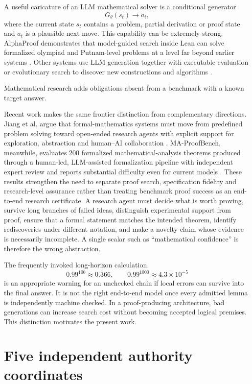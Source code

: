 \documentclass[11pt]{article}
\begin{document}
A useful caricature of an LLM mathematical solver is a conditional generator
\[
G_\theta(s_t)\rightarrow a_t,
\]
where the current state $s_t$ contains a problem, partial derivation or proof state and $a_t$ is a plausible next move. This capability can be extremely strong. AlphaProof demonstrates that model-guided search inside Lean can solve formalized olympiad and Putnam-level problems at a level far beyond earlier systems \cite{hubert2025}. Other systems use LLM generation together with executable evaluation or evolutionary search to discover new constructions and algorithms \cite{romera2024,novikov2025,georgiev2025}.

Mathematical research adds obligations absent from a benchmark with a known target answer.

Recent work makes the same frontier distinction from complementary directions. Jiang et al. argue that formal-mathematics systems must move from predefined problem solving toward open-ended research agents with explicit support for exploration, abstraction and human--AI collaboration \cite{jiang2026frontier}. MA-ProofBench, meanwhile, evaluates 200 formalized mathematical-analysis theorems produced through a human-led, LLM-assisted formalization pipeline with independent expert review and reports substantial difficulty even for current models \cite{pu2026maproof}. These results strengthen the need to separate proof search, specification fidelity and research-level assurance rather than treating benchmark proof success as an end-to-end research certificate. A research agent must decide what is worth proving, survive long branches of failed ideas, distinguish experimental support from proof, ensure that a formal statement matches the intended theorem, identify rediscoveries under different notation, and make a novelty claim whose evidence is necessarily incomplete. A single scalar such as ``mathematical confidence'' is therefore the wrong abstraction.

The frequently invoked long-horizon calculation
\[
0.99^{100}\approx 0.366,
\qquad
0.99^{1000}\approx 4.3\times 10^{-5}
\]
is an appropriate warning for an unchecked chain if local errors can survive into the final answer. It is not the right end-to-end model once every admitted lemma is independently machine checked. In a proof-producing architecture, bad generations can increase search cost without becoming accepted logical premises. This distinction motivates the present work.

\section{Five independent authority coordinates}
\end{document}
